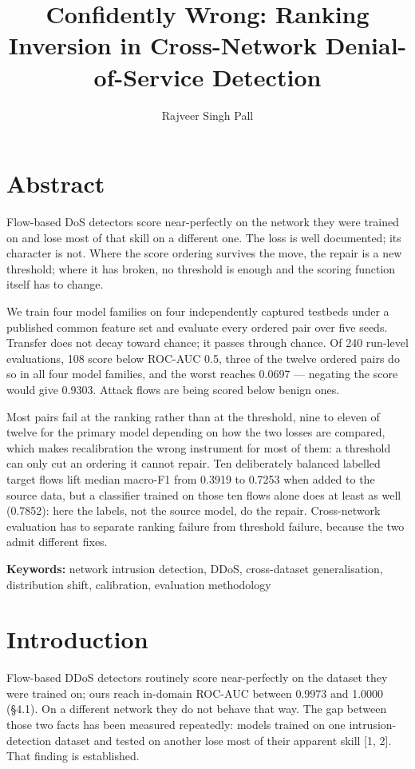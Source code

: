 \documentclass[11pt,a4paper]{article}
\title{Confidently Wrong: Ranking Inversion in Cross-Network Denial-of-Service Detection}
\author{Rajveer Singh Pall}
\date{}
\begin{document}
\maketitle



\section*{Abstract}

Flow-based DoS detectors score near-perfectly on the network they were trained on and lose most of that skill on a different one. The loss is well documented; its character is not. Where the score ordering survives the move, the repair is a new threshold; where it has broken, no threshold is enough and the scoring function itself has to change.

We train four model families on four independently captured testbeds under a published common feature set and evaluate every ordered pair over five seeds. Transfer does not decay toward chance; it passes through chance. Of 240 run-level evaluations, 108 score below ROC-AUC 0.5, three of the twelve ordered pairs do so in all four model families, and the worst reaches 0.0697 --- negating the score would give 0.9303. Attack flows are being scored below benign ones.

Most pairs fail at the ranking rather than at the threshold, nine to eleven of twelve for the primary model depending on how the two losses are compared, which makes recalibration the wrong instrument for most of them: a threshold can only cut an ordering it cannot repair. Ten deliberately balanced labelled target flows lift median macro-F1 from 0.3919 to 0.7253 when added to the source data, but a classifier trained on those ten flows alone does at least as well (0.7852): here the labels, not the source model, do the repair. Cross-network evaluation has to separate ranking failure from threshold failure, because the two admit different fixes.

\textbf{Keywords:} network intrusion detection, DDoS, cross-dataset generalisation, distribution shift, calibration, evaluation methodology


\section{Introduction}

Flow-based DDoS detectors routinely score near-perfectly on the dataset they were trained on; ours reach in-domain ROC-AUC between 0.9973 and 1.0000 (§4.1). On a different network they do not behave that way. The gap between those two facts has been measured repeatedly: models trained on one intrusion-detection dataset and tested on another lose most of their apparent skill [1, 2]. That finding is established.
\end{document}
